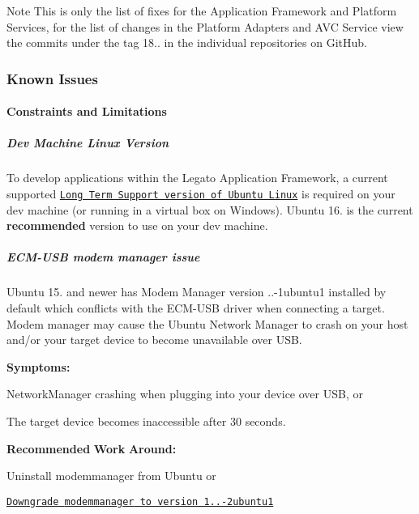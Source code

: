 \begin{DoxyNote}{Note}
This is only the list of fixes for the Application Framework and Platform Services, for the list of changes in the Platform Adapters and A\+VC Service view the commits under the tag 18.. in the individual repositories on Git\+Hub.
\end{DoxyNote}
\hypertarget{releaseNotes18030_rn1803_KnownIssues}{}\subsubsection{Known Issues}\label{releaseNotes18030_rn1803_KnownIssues}
\hypertarget{releaseNotes18030_rn1803_Constraints}{}\paragraph{Constraints and Limitations}\label{releaseNotes18030_rn1803_Constraints}
\hypertarget{releaseNotes18030_rn1803_ContraintsLinuxSupport}{}\subparagraph{Dev Machine Linux Version}\label{releaseNotes18030_rn1803_ContraintsLinuxSupport}
To develop applications within the Legato Application Framework, a current supported \href{https://www.ubuntu.com/info/release-end-of-life}{\tt Long Term Support version of Ubuntu Linux} is required on your dev machine (or running in a virtual box on Windows). Ubuntu 16. is the current {\bfseries recommended} version to use on your dev machine.\hypertarget{releaseNotes18030_rn1803_ConstECMUSB}{}\subparagraph{E\+C\+M-\/\+U\+S\+B modem manager issue}\label{releaseNotes18030_rn1803_ConstECMUSB}
Ubuntu 15. and newer has Modem Manager version {..-\/1ubuntu1} installed by default which conflicts with the E\+C\+M-\/\+U\+SB driver when connecting a target. Modem manager may cause the Ubuntu Network Manager to crash on your host and/or your target device to become unavailable over U\+SB.

{\bfseries Symptoms\+:} 
\begin{DoxyItemize}
\item Network\+Manager crashing when plugging into your device over U\+SB, or
\item The target device becomes inaccessible after 30 seconds.
\end{DoxyItemize}

{\bfseries Recommended} {\bfseries Work} {\bfseries Around\+:} 
\begin{DoxyItemize}
\item Uninstall {\ttfamily modemmanager} from Ubuntu or
\item \href{http://packages.ubuntu.com/trusty/modemmanager}{\tt Downgrade {\ttfamily modemmanager} to version 1..-\/2ubuntu1}
\end{DoxyItemize}

